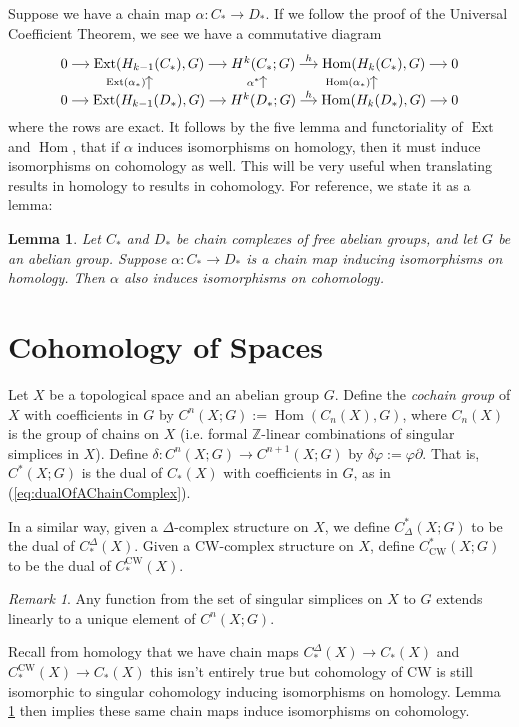 \documentclass{book}
\newcommand{\bbZ}{\mathbb{Z}}
\renewcommand{\phi}{\varphi}
\DeclareMathOperator{\Hom}{Hom}
\DeclareMathOperator{\Ext}{Ext}
\newtheorem{lemma}[theorem]{Lemma}
\theoremstyle{definition}
\theoremstyle{remark}
\newtheorem{remark}[theorem]{Remark}
\numberwithin{equation}{section}
\begin{document}
Suppose we have a chain map $\alpha \colon C_* \to D_*$. If we follow the proof of the Universal Coefficient Theorem, we see we have a commutative diagram 
\begin{equation} \begin{tikzcd}[cramped,sep=small]
    0 \arrow[r] & \Ext(H_{k-1}(C_*),G) \arrow[r]                            & H^k(C_*;G) \arrow[r,"h"]                      & \Hom(H_k(C_*),G) \arrow[r]                            & 0 \\
    0 \arrow[r] & \Ext(H_{k-1}(D_*),G) \arrow[r] \arrow[u,"\Ext(\alpha_*)"] & H^k(D_*;G) \arrow[r,"h"] \arrow[u,"\alpha^*"] & \Hom(H_k(D_*),G) \arrow[r] \arrow[u,"\Hom(\alpha_*)"] & 0
\end{tikzcd} \end{equation}
where the rows are exact. It follows by the five lemma and functoriality of $\Ext$ and $\Hom$, that if $\alpha$ induces isomorphisms on homology, then it must induce isomorphisms on cohomology as well. This will be very useful when translating results in homology to results in cohomology. For reference, we state it as a lemma:
\begin{lemma} \label{lem:isomorphismsOnCohomology}
    Let $C_*$ and $D_*$ be chain complexes of free abelian groups, and let $G$ be an abelian group. Suppose $\alpha \colon C_* \to D_*$ is a chain map inducing isomorphisms on homology. Then $\alpha$ also induces isomorphisms on cohomology.
\end{lemma}

\section{Cohomology of Spaces}
Let $X$ be a topological space and an abelian group $G$. Define the \textit{cochain group} of $X$ with coefficients in $G$ by $C^n(X;G) := \Hom(C_n(X),G)$, where $C_n(X)$ is the group of chains on $X$ (i.e. formal $\bbZ$-linear combinations of singular simplices in $X$). Define $\delta \colon C^n(X;G) \to C^{n+1}(X;G)$ by $\delta\phi := \phi\partial$. That is, $C^*(X;G)$ is the dual of $C_*(X)$ with coefficients in $G$, as in (\ref{eq:dualOfAChainComplex}).

In a similar way, given a $\Delta$-complex structure on $X$, we define $C^*_\Delta(X;G)$ to be the dual of $C_*^\Delta(X)$. Given a CW-complex structure on $X$, define $C^*_\text{CW}(X;G)$ to be the dual of $C_*^\text{CW}(X)$.
\begin{remark}
    Any function from the set of singular simplices on $X$ to $G$ extends linearly to a unique element of $C^n(X;G)$.
\end{remark}
Recall from homology that we have chain maps $C^\Delta_*(X) \to C_*(X)$ and {\color{red} $C^\text{CW}_*(X) \to C_*(X)$ this isn't entirely true but cohomology of CW is still isomorphic to singular cohomology} inducing isomorphisms on homology. Lemma \ref{lem:isomorphismsOnCohomology} then implies these same chain maps induce isomorphisms on cohomology.
 
\end{document}

